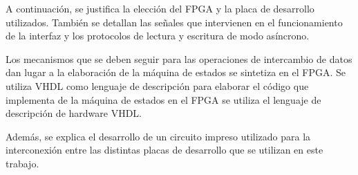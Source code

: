 
A continuación, se justifica la elección del FPGA y la placa de desarrollo utilizados. También se detallan las señales que intervienen en el funcionamiento de la interfaz y los protocolos de lectura y escritura de modo asíncrono.

Los mecanismos que se deben seguir para las operaciones de intercambio de datos dan lugar a la elaboración de la máquina de estados se sintetiza en el FPGA. Se utiliza VHDL como lenguaje de descripción para elaborar el código que implementa de la máquina de estados en el FPGA se utiliza el lenguaje de descripción de hardware VHDL.

Además, se explica el desarrollo de un circuito impreso utilizado para la interconexión entre las distintas placas de desarrollo que se utilizan en este trabajo.
